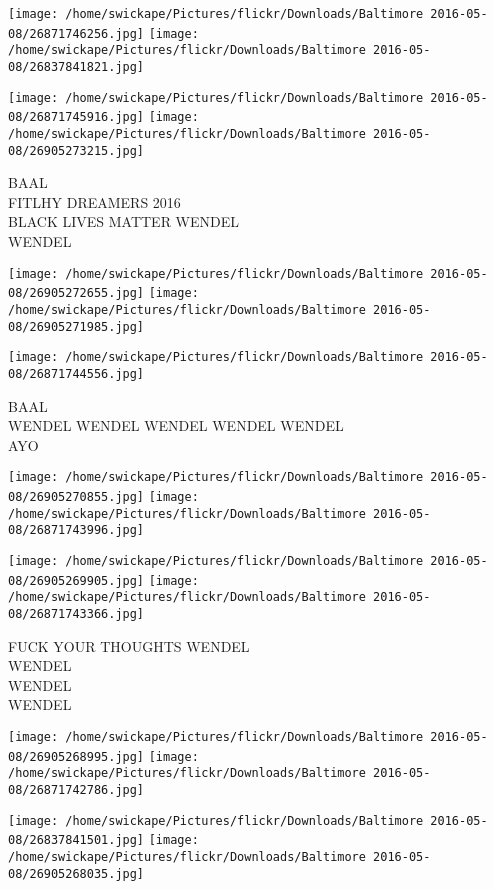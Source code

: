 \documentclass[10pt,letterpaper]{article}
\begin{document}
\texttt{[image: /home/swickape/Pictures/flickr/Downloads/Baltimore 2016-05-08/26871746256.jpg]}
\texttt{[image: /home/swickape/Pictures/flickr/Downloads/Baltimore 2016-05-08/26837841821.jpg]}

\texttt{[image: /home/swickape/Pictures/flickr/Downloads/Baltimore 2016-05-08/26871745916.jpg]}
\texttt{[image: /home/swickape/Pictures/flickr/Downloads/Baltimore 2016-05-08/26905273215.jpg]}

BAAL\\
FITLHY DREAMERS 2016\\
BLACK LIVES MATTER WENDEL\\
WENDEL
\pagebreak

\texttt{[image: /home/swickape/Pictures/flickr/Downloads/Baltimore 2016-05-08/26905272655.jpg]}
\texttt{[image: /home/swickape/Pictures/flickr/Downloads/Baltimore 2016-05-08/26905271985.jpg]}

\vspace{0.25in}
\texttt{[image: /home/swickape/Pictures/flickr/Downloads/Baltimore 2016-05-08/26871744556.jpg]}

BAAL\\
WENDEL WENDEL WENDEL WENDEL WENDEL\\
AYO
\pagebreak

\texttt{[image: /home/swickape/Pictures/flickr/Downloads/Baltimore 2016-05-08/26905270855.jpg]}
\texttt{[image: /home/swickape/Pictures/flickr/Downloads/Baltimore 2016-05-08/26871743996.jpg]}

\texttt{[image: /home/swickape/Pictures/flickr/Downloads/Baltimore 2016-05-08/26905269905.jpg]}
\texttt{[image: /home/swickape/Pictures/flickr/Downloads/Baltimore 2016-05-08/26871743366.jpg]}

FUCK YOUR THOUGHTS WENDEL\\
WENDEL\\
WENDEL\\
WENDEL
\pagebreak

\texttt{[image: /home/swickape/Pictures/flickr/Downloads/Baltimore 2016-05-08/26905268995.jpg]}
\texttt{[image: /home/swickape/Pictures/flickr/Downloads/Baltimore 2016-05-08/26871742786.jpg]}

\texttt{[image: /home/swickape/Pictures/flickr/Downloads/Baltimore 2016-05-08/26837841501.jpg]}
\texttt{[image: /home/swickape/Pictures/flickr/Downloads/Baltimore 2016-05-08/26905268035.jpg]}
\end{document}

